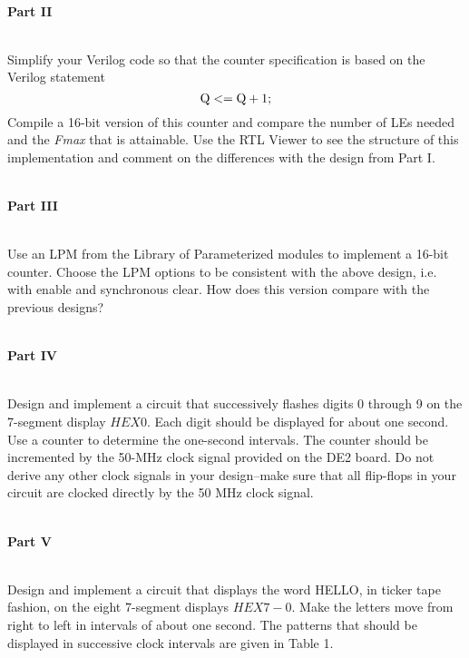 \documentclass[psfig,10pt,fullpage]{article}
\begin{document}
~\\
\noindent
{\bf Part II}

~\\
\noindent
Simplify your Verilog code so that the counter specification is based on
the Verilog statement
$$
{\rm Q <= Q + 1;}
$$
\noindent
Compile a 16-bit version of this counter and compare the number of LEs needed
and the {\it Fmax} that is attainable.
Use the RTL Viewer to see the structure of this implementation and comment on
the differences with the design from Part I.

~\\
\noindent
{\bf Part III}

~\\
\noindent
Use an LPM from the Library of Parameterized modules to implement a 16-bit 
counter. Choose the LPM options to be consistent with the above design, i.e.
with enable and synchronous clear.
How does this version compare with the previous designs?

~\\
\noindent
{\bf Part IV}

~\\
\noindent
Design and implement a circuit that successively flashes digits 0 
through 9 on the 7-segment display $HEX0$. Each digit should be 
displayed for about one second. Use a counter to determine the one-second 
intervals. The counter should be incremented by the 50-MHz clock signal 
provided on the DE2 board. Do not derive any other clock signals in your design--make 
sure that all flip-flops in your circuit are clocked directly by the 50 MHz clock signal.

~\\
\noindent
{\bf Part V}

~\\
\noindent
Design and implement a circuit that displays the word HELLO, in
ticker tape fashion, on the eight 7-segment displays $HEX7-0$. 
Make the letters move from right to left in intervals of about one second.
The patterns that should be displayed in successive clock intervals are given in Table 1.
\end{document}
